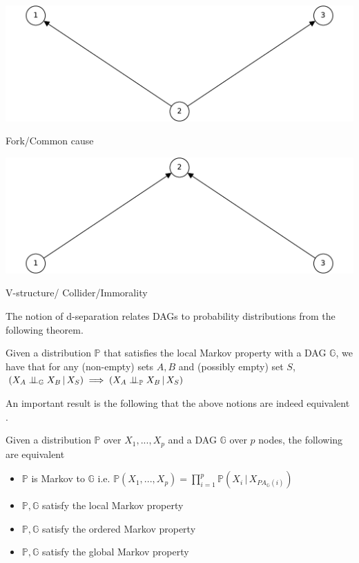 \documentclass{tufte-book}
\begin{document}
\begin{Definition}
 \begin{marginfigure} \includegraphics[width=\linewidth]{ ./figures/fork.pdf}\caption{ Fork/Common cause} \end{marginfigure} 
 \begin{marginfigure} \includegraphics[width=\linewidth]{ ./figures/collider.pdf}\caption{ V-structure/ Collider/Immorality} \end{marginfigure} 


The notion of d-separation relates DAGs to probability distributions from the following theorem.
\begin{definition}\label{thm:dagci}

Given a distribution $\mathbb{P}$ that satisfies the local Markov property with a DAG $\mathbb{G}$, we have that for any (non-empty) sets $A,B$ and (possibly empty) set $S$, $(X_A \perp \!\!\! \perp_{\mathbb{G}} X_B \,|\,X_S) \implies (X_A \perp \!\!\! \perp_{\mathbb{P}} X_B \,|\, X_S)$


\end{definition}

An important result is the following that the above notions are indeed equivalent \cite{duarte-2020-algeb}.

\begin{theorem}\label{thm:markovdag}
Given a distribution $\mathbb{P}$ over $X_1,...,X_p$ and a DAG $\mathbb{G}$ over $p$ nodes, the following are equivalent

\begin{itemize}
\item $\mathbb{P}$ is Markov to $\mathbb{G}$ i.e. $\mathbb{P}(X_1,...,X_p) = \prod_{i=1}^p \mathbb{P}(X_i \, |\, X_{PA_{\mathbb{G}}(i)})$
\item $\mathbb{P}, \mathbb{G}$ satisfy the local Markov property
\item $\mathbb{P}, \mathbb{G}$ satisfy the ordered Markov property
\item $\mathbb{P}, \mathbb{G}$ satisfy the global Markov property
\end{itemize}


\end{theorem}
\end{Definition}
\end{document}
